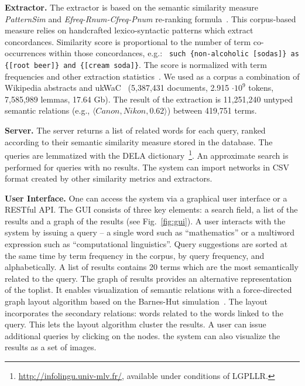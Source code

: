 \documentclass[runningheads,a4paper]{llncs}
\begin{document}
\textbf{Extractor.} The extractor is based on the semantic similarity measure \textit{PatternSim} and \textit{Efreq-Rnum-Cfreq-Pnum} re-ranking formula~\cite{panchenko2012konvens}. 
This corpus-based measure relies on handcrafted lexico-syntactic patterns which extract concordances. Similarity score is proportional to the number of term co-occurrences within those concordances, e.g.: \texttt{ \footnotesize such \{non-alcoholic [sodas]\} as \{[root beer]\} and \{[cream soda]\}}. The score is normalized with term frequencies and other extraction statistics~\cite{panchenko2012konvens}. We used as a  corpus a combination of Wikipedia abstracts and ukWaC~\cite{baroni2009wacky}  (5,387,431 documents, 2.915 $\cdot 10^9$ tokens, 7,585,989 lemmas, 17.64 Gb). 
The result of the extraction is 11,251,240 untyped semantic relations (e.g., $\langle Canon, Nikon, 0.62 \rangle$) between 419,751 terms. 
 
\textbf{Server.} The server returns a list of related words for each query, ranked according to their semantic similarity measure stored in the database. The queries are lemmatized with the DELA dictionary~\footnote{\url{http://infolingu.univ-mlv.fr/}, available under conditions of LGPLLR.}. An approximate search is performed for queries with no results. The system can import networks in CSV format created by other similarity metrics and extractors. 

\textbf{User Interface.} One can access the system via a graphical user interface or a RESTful API. The GUI  consists of three key elements: a search field, a list of the results and a graph of the results (see Fig.~\ref{fig:gui}). A user  interacts with the system by issuing a query -- a single word such as ``mathematics'' or a multiword expression such as ``computational linguistics''. Query suggestions are sorted at the same time by term frequency in the corpus, by query frequency, and alphabetically. A list of results contains 20 terms which are the most semantically related to the query. The graph of results provides an alternative representation of the toplist. It enables visualization of semantic relations with a force-directed graph layout algorithm based on the Barnes-Hut simulation~\cite{barnes1986hierarchical}. The layout incorporates the secondary relations: words related to the words linked to the query. This lets the layout algorithm cluster the results. A user can issue additional queries by clicking on the nodes. the system can also visualize the results as a set of images. 
\end{document}
